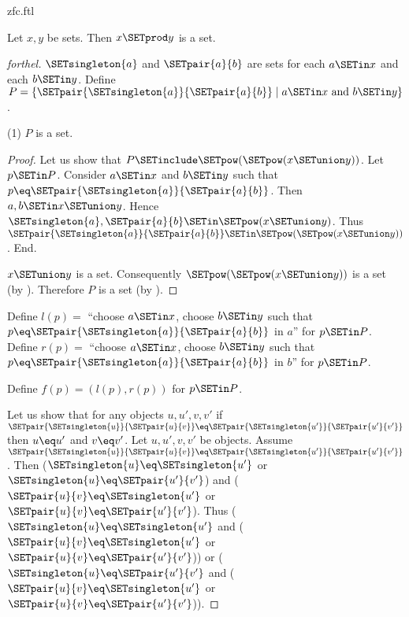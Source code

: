 \documentclass{naproche-library}
\begin{document}
\begin{smodule}[title=ZFC]{zfc.ftl}
\begin{proposition}[forthel,id=FOUNDATIONS_10_4458706448154624]
  Let $x, y$ be sets.
  Then $x \SETprod y$ is a set.
\end{proposition}
\begin{proof}[forthel]
  $\SETsingleton{a}$ and $\SETpair{a}{b}$ are sets for each $a \SETin x$ and each $b \SETin y$.
  Define $P = \{ \SETpair{\SETsingleton{a}}{\SETpair{a}{b}} \mid a \SETin x\text{ and }b \SETin y \}$.

  (1) $P$ is a set.
  \begin{proof}
    Let us show that $P \SETinclude \SETpow(\SETpow(x \SETunion y))$.
      Let $p \SETin P$.
      Consider $a \SETin x$ and $b \SETin y$ such that $p \eq \SETpair{\SETsingleton{a}}{\SETpair{a}{b}}$.
      Then $a, b \SETin x \SETunion y$.
      Hence $\SETsingleton{a}, \SETpair{a}{b} \SETin \SETpow(x \SETunion y)$.
      Thus $\SETpair{\SETsingleton{a}}{\SETpair{a}{b}} \SETin \SETpow(\SETpow(x \SETunion y))$.
    End.

    $x \SETunion y$ is a set.
    Consequently $\SETpow(\SETpow(x \SETunion y))$ is a set (by ).
    Therefore $P$ is a set (by ).
  \end{proof}

  Define $l(p) =$ ``choose $a \SETin x$, choose $b \SETin y$ such that $p \eq \SETpair{\SETsingleton{a}}{\SETpair{a}{b}}$ in $a$'' for $p \SETin P$.
  Define $r(p) =$ ``choose $a \SETin x$, choose $b \SETin y$ such that $p \eq \SETpair{\SETsingleton{a}}{\SETpair{a}{b}}$ in $b$'' for $p \SETin P$.

  Define $f(p) = (l(p), r(p))$ for $p \SETin P$.

  Let us show that for any objects $u, u', v, v'$ if
  $\SETpair{\SETsingleton{u}}{\SETpair{u}{v}} \eq \SETpair{\SETsingleton{u'}}{\SETpair{u'}{v'}}$ then $u \eq u'$ and $v \eq v'$.
    Let $u, u', v, v'$ be objects.
    Assume $\SETpair{\SETsingleton{u}}{\SETpair{u}{v}} \eq \SETpair{\SETsingleton{u'}}{\SETpair{u'}{v'}}$.
    Then ($\SETsingleton{u} \eq \SETsingleton{u'}$ or $\SETsingleton{u} \eq \SETpair{u'}{v'}$) and ($\SETpair{u}{v} \eq \SETsingleton{u'}$ or $\SETpair{u}{v} \eq \SETpair{u'}{v'}$).
    Thus ($\SETsingleton{u} \eq \SETsingleton{u'}$ and ($\SETpair{u}{v} \eq \SETsingleton{u'}$ or $\SETpair{u}{v} \eq \SETpair{u'}{v'}$)) or ($\SETsingleton{u} \eq \SETpair{u'}{v'}$ and ($\SETpair{u}{v} \eq \SETsingleton{u'}$ or $\SETpair{u}{v} \eq \SETpair{u'}{v'}$)).


\end{proof}
\end{smodule}
\end{document}
